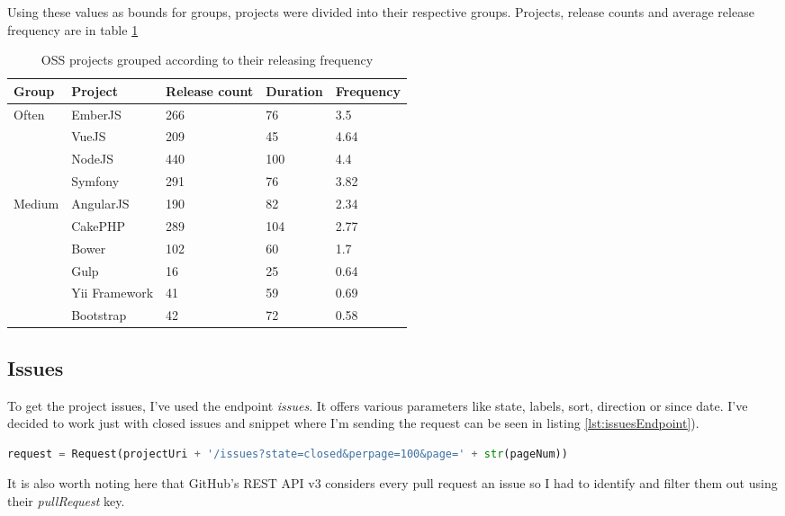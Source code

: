 Using these values as bounds for groups, projects were divided into their respective groups. Projects, release counts and average release frequency are in table \ref{table:releaseGroupsCalculation}

\begin{table}[H]
\centering
\begin{tabular}{| p{2cm}|p{3cm}|p{3cm}|p{2cm}|p{3cm}|}
 \hline
\textbf{Group} & \textbf{ Project }& \textbf{Release count} & \textbf{ Duration }& \textbf{Frequency}\\
 \hline
  \multirow{4}{*}{Often}   & EmberJS & 266   & 76 & 3.5\\ 
    & VueJS &  209 & 45 & 4.64 \\ 
    & NodeJS & 440 & 100 & 4.4\\  
    & Symfony & 291 & 76 & 3.82\\ \hline 
  \multirow{4}{*}{Medium}   & AngularJS & 190   & 82 & 2.34\\ 
    & CakePHP & 289 & 104 & 2.77\\ 
    & Bower &  102 & 60 & 1.7\\   \hline 
  \multirow{4}{*}{Seldom}   & Gulp & 16 & 25 & 0.64\\ 
    & Yii Framework & 41 & 59 & 0.69\\ 
    & Bootstrap &  42 & 72 & 0.58\\  \hline 
\end{tabular}
\caption{OSS projects grouped according to their releasing frequency}
\label{table:releaseGroupsCalculation}
\end{table}


\subsection{Issues} \label{ssec:issuesMining}
To get the project issues, I've used the endpoint \textit{issues}. It offers various parameters like state, labels, sort, direction or since date. I've decided to work just with closed issues and snippet where I'm sending the request can be seen in listing \ref{lst:issuesEndpoint}).

\begin{lstlisting}[caption={Requesting 100 closed issues},label={lst:issuesEndpoint},language=Python]
request = Request(projectUri + '/issues?state=closed&perpage=100&page=' + str(pageNum))
\end{lstlisting}

It is also worth noting here that GitHub's REST API v3 considers every pull request an issue so I had to identify and filter them out using their \textit{pullRequest} key.

